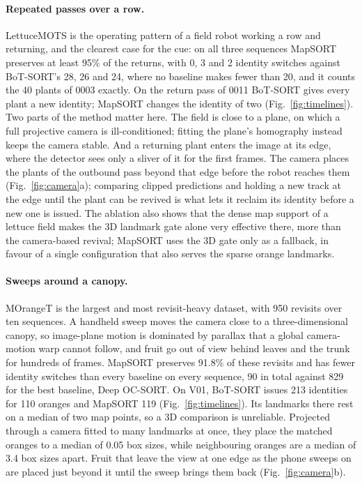 \documentclass[pdflatex,sn-basic]{sn-jnl}%
\theoremstyle{thmstyleone}%
\begin{document}
\paragraph{Repeated passes over a row.} LettuceMOTS is the operating pattern of a field robot working a row and returning, and the clearest case for the cue: on all three sequences MapSORT preserves at least 95\% of the returns, with 0, 3 and 2 identity switches against BoT-SORT's 28, 26 and 24, where no baseline makes fewer than 20, and it counts the 40 plants of 0003 exactly. On the return pass of 0011 BoT-SORT gives every plant a new identity; MapSORT changes the identity of two (Fig.~\ref{fig:timelines}). Two parts of the method matter here. The field is close to a plane, on which a full projective camera is ill-conditioned; fitting the plane's homography instead keeps the camera stable. And a returning plant enters the image at its edge, where the detector sees only a sliver of it for the first frames. The camera places the plants of the outbound pass beyond that edge before the robot reaches them (Fig.~\ref{fig:camera}a); comparing clipped predictions and holding a new track at the edge until the plant can be revived is what lets it reclaim its identity before a new one is issued. The ablation also shows that the dense map support of a lettuce field makes the 3D landmark gate alone very effective there, more than the camera-based revival; MapSORT uses the 3D gate only as a fallback, in favour of a single configuration that also serves the sparse orange landmarks.

\paragraph{Sweeps around a canopy.} MOrangeT is the largest and most revisit-heavy dataset, with 950 revisits over ten sequences. A handheld sweep moves the camera close to a three-dimensional canopy, so image-plane motion is dominated by parallax that a global camera-motion warp cannot follow, and fruit go out of view behind leaves and the trunk for hundreds of frames. MapSORT preserves 91.8\% of these revisits and has fewer identity switches than every baseline on every sequence, 90 in total against 829 for the best baseline, Deep OC-SORT. On V01, BoT-SORT issues 213 identities for 110 oranges and MapSORT 119 (Fig.~\ref{fig:timelines}). Its landmarks there rest on a median of two map points, so a 3D comparison is unreliable. Projected through a camera fitted to many landmarks at once, they place the matched oranges to a median of 0.05 box sizes, while neighbouring oranges are a median of 3.4 box sizes apart. Fruit that leave the view at one edge as the phone sweeps on are placed just beyond it until the sweep brings them back (Fig.~\ref{fig:camera}b).
\end{document}
